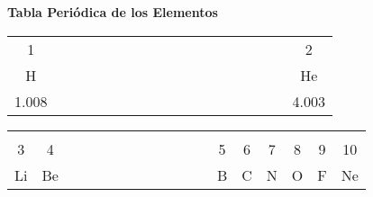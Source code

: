 \documentclass[10pt,landscape]{book}
\begin{document}
\thispagestyle{empty}
\Large
\begin{center}
    \textcolor[rgb]{0.15,0.15,0.55}{{\huge \bf \sc \hspace{-1cm} Tabla Periódica de los Elementos}\\[-0.3cm]}
    \begin{tabular}{|c|p{10.7mm}*{14}{p{9.86mm}}p{12.2mm}|c|}
        \cline{1-1}\cline{18-18}
        {\small 1}                                &  &  &  &  &  &  &  &  &  &  &  &  &  &  &  &  & \small 2                                   \\[-1mm]
        H                                         &  &  &  &  &  &  &  &  &  &  &  &  &  &  &  &  & He                                         \\[-2mm]
        \small \hspace{1.6mm}1.008\hspace{1.65mm} &  &  &  &  &  &  &  &  &  &  &  &  &  &  &  &  & \small \hspace{1.55mm}4.003\hspace{2.25mm} \\\cline{1-2}\cline{13-18}
    \end{tabular}
    \begin{tabular}{|c|c|p{17.8mm}*{9}{p{8.98mm}}|c|c|c|c|c|c|}
                                                   &                                             &  &  &  &  &  &  &  &  &  &  &                                            &                                             &                                           &               &                                           &               \\[-6.6mm]
        \small 3                                   & \small 4                                    &  &  &  &  &  &  &  &  &  &  & \small 5                                   & \small 6                                    & \small 7                                  & \small 8      & \small 9                                  & \small 10     \\[-1mm]
        Li                                         & Be                                          &  &  &  &  &  &  &  &  &  &  & B                                          & C                                           & N                                         & O             & F                                         & Ne            \\[-2mm]

\end{tabular}
\end{center}
\end{document}

